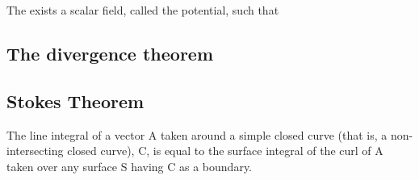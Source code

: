 \documentclass[12pt, a4paper]{article}
\begin{document}
The exists a scalar field, called the potential, such that

\subsection*{The divergence theorem}

\subsection*{Stokes Theorem}

The line integral of a vector A taken around a simple closed curve (that is,
a non-intersecting closed curve), C, is equal to the surface integral of the
curl of A taken over any surface S having C as a boundary.
\end{document}
